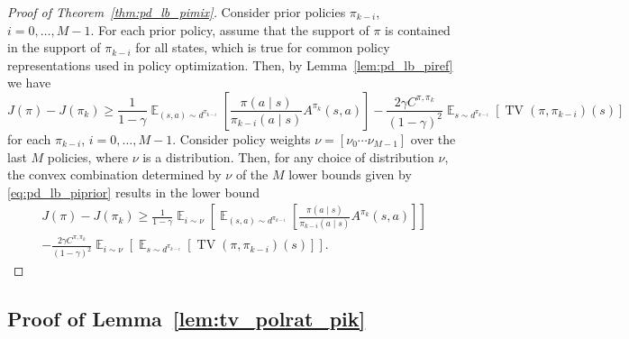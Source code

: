 \documentclass{article}
\begin{document}
\begin{proof}[Proof of Theorem~\ref{thm:pd_lb_pimix}]
Consider prior policies $\pi_{k-i}$, $i=0,\ldots,M-1$. For each prior policy, assume that the support of $\pi$ is contained in the support of $\pi_{k-i}$ for all states, which is true for common policy representations used in policy optimization. Then, by Lemma~\ref{lem:pd_lb_piref} we have
\begin{equation}\label{eq:pd_lb_piprior}
J(\pi) - J(\pi_k) \geq \frac{1}{1-\gamma} \mathop{\mathbb{E}}_{(s,a) \sim d^{\pi_{k-i}}} \left[ \frac{\pi(a \mid s)}{\pi_{k-i}(a \mid s)} A^{\pi_k}(s,a) \right] - \frac{2 \gamma C^{\pi,\pi_k}}{(1-\gamma)^2} \mathop{\mathbb{E}}_{s \sim d^{\pi_{k-i}}} \left[ \operatorname{TV}(\pi,\pi_{k-i})(s) \right]
\end{equation}
for each $\pi_{k-i}$, $i=0,\ldots,M-1$. Consider policy weights $\nu = \left[ \nu_0 \cdots \nu_{M-1} \right]$ over the last $M$ policies, where $\nu$ is a distribution. Then, for any choice of distribution $\nu$, the convex combination determined by $\nu$ of the $M$ lower bounds given by \eqref{eq:pd_lb_piprior} results in the lower bound
\begin{multline}
J(\pi) - J(\pi_k) \geq \frac{1}{1-\gamma} \mathop{\mathbb{E}}_{i \sim \nu} \left[ \mathop{\mathbb{E}}_{(s,a) \sim d^{\pi_{k-i}}} \left[ \frac{\pi(a \mid s)}{\pi_{k-i}(a \mid s)} A^{\pi_k}(s,a) \right] \right] \\ - \frac{2 \gamma C^{\pi,\pi_k}}{(1-\gamma)^2} \mathop{\mathbb{E}}_{i \sim \nu} \left[  \mathop{\mathbb{E}}_{s \sim d^{\pi_{k-i}}} \left[ \operatorname{TV}(\pi,\pi_{k-i})(s) \right] \right].
\end{multline}
\end{proof}

\subsection{Proof of Lemma~\ref{lem:tv_polrat_pik}}
\end{document}
